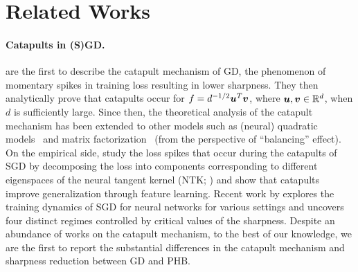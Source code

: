 \section{Related Works}
\label{app:related-works}

\paragraph{Catapults in (S)GD.}
\citet{lewkowycz2020catapult} are the first to describe the catapult mechanism of GD, the phenomenon of momentary spikes in training loss resulting in lower sharpness. They then analytically prove that catapults occur for $f = d^{-1/2} {\bm{u}}^T {\bm{v}}$, where ${\bm{u}}, {\bm{v}} \in {\mathbb{R}}^d$, when $d$ is sufficiently large.
Since then, the theoretical analysis of the catapult mechanism has been extended to other models such as (neural) quadratic models~\citep{zhu2023catapultquadratic,meltzer2023catapult,agarwala2023eos} and matrix factorization~\citep{wang2022implicit,wang2023catapult} (from the perspective of ``balancing'' effect).
On the empirical side, \citet{zhu2023catapult} study the loss spikes that occur during the catapults of SGD by decomposing the loss into components corresponding to different eigenspaces of the neural tangent kernel (NTK; \citet{jacot2018ntk}) and show that catapults improve generalization through feature learning.
Recent work by \citet{kalra2023catapult} explores the training dynamics of SGD for neural networks for various settings and uncovers four distinct regimes controlled by critical values of the sharpness.
Despite an abundance of works on the catapult mechanism, to the best of our knowledge, we are the first to report the substantial differences in the catapult mechanism and sharpness reduction between GD and PHB.%





